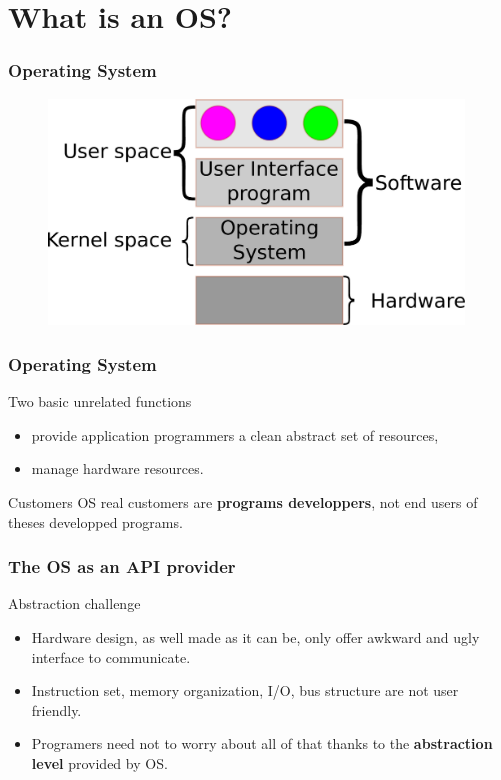 \section{What is an OS?}
  \begin{frame}
    \frametitle{Operating System}
    \begin{figure}[t]
      \centering
      \includegraphics[height=6cm]{./imgs/os.pdf}
      \label{fig:os}
    \end{figure}
  \end{frame}

  \begin{frame}
    \frametitle{Operating System}
        \begin{block}{Two basic unrelated functions}
          \begin{itemize}
            \item provide application programmers a clean abstract set of resources,
            \item manage hardware resources.
          \end{itemize}
        \end{block}

        \begin{block}{Customers}
          OS real customers are \textbf{programs developpers}, not end users of theses developped programs.
        \end{block}
  \end{frame}

  \begin{frame}
    \frametitle{The OS as an API provider}
        \begin{block}{Abstraction challenge}
          \begin{itemize}
            \item Hardware design, as well made as it can be, only offer awkward and ugly interface to communicate.
            \item Instruction set, memory organization, I/O, bus structure are not user friendly.
            \item Programers need not to worry about all of that thanks to the \textbf{abstraction level} provided by OS.
          \end{itemize}
        \end{block}
  \end{frame}


